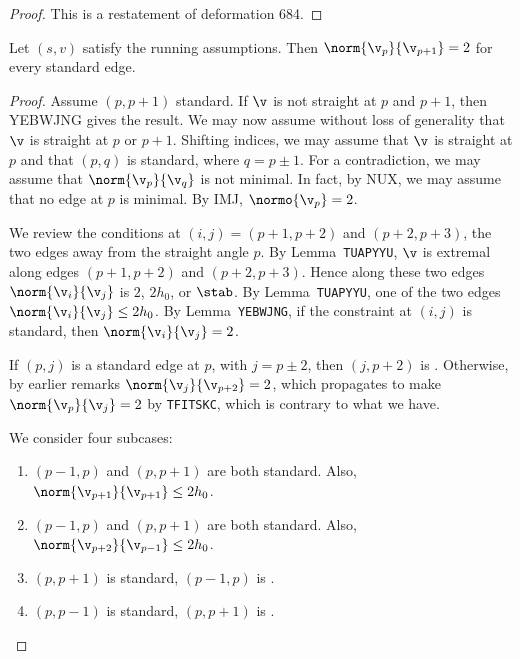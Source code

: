 \begin{proof} This is a restatement of deformation 684.
\end{proof}

\begin{lemma}[] Let $(s,v)$ satisfy the running assumptions.  Then $\norm{\v_p}{\v_{p+1}}=2$
for every standard edge.
\end{lemma}

\begin{proof} Assume $(p,p+1)$ standard.  If $\v$ is not straight at $p$ and $p+1$, then YEBWJNG
gives the result.  We may now assume without loss of generality that $\v$ is straight at $p$ or $p+1$.
Shifting indices, we may assume that $\v$ is straight at $p$ and that $(p,q)$ is standard, where $q=p\pm 1$.
For a contradiction, we may assume that $\norm{\v_p}{\v_{q}}$ is not minimal.  
In fact, by NUX, we may assume that no edge at $p$ is minimal.
By IMJ, $\normo{\v_p}=2$.



We review the conditions at $(i,j)=(p+1,p+2)$ and $(p+2,p+3)$, the two edges away from the straight angle $p$.
By Lemma~{\tt TUAPYYU}, $\v$ is extremal along edges $(p+1,p+2)$ and $(p+2,p+3)$. Hence
along these two edges $\norm{\v_i}{\v_j}$ is $2$, $2h_0$, or $\stab$.  By Lemma~{\tt TUAPYYU},
one of the two edges $\norm{\v_i}{\v_j}\le 2h_0$.  
By Lemma~{\tt YEBWJNG}, if the constraint at $(i,j)$
is standard, then $\norm{\v_i}{\v_j}=2$. 



If $(p,j)$ is a standard edge at $p$, with $j=p\pm 2$,
then $(j,p+2)$ is \prop. Otherwise, by earlier remarks $\norm{\v_j}{\v_{p+2}}=2$, which propagates
to make $\norm{\v_p}{\v_j}=2$ by {\tt TFITSKC}, which is contrary to what we have.

We consider four subcases:
\begin{enumerate}
\item $(p-1,p)$ and $(p,p+1)$ are both standard.  Also, $\norm{\v_{p+1}}{\v_{p+1}}\le 2h_0$.
\item $(p-1,p)$ and $(p,p+1)$ are both standard.  Also, $\norm{\v_{p+2}}{\v_{p-1}}\le 2h_0$.
\item $(p,p+1)$ is standard,  $(p-1,p)$ is \prop.
\item $(p,p-1)$ is standard,  $(p,p+1)$ is \prop.
\end{enumerate}


\end{proof}
